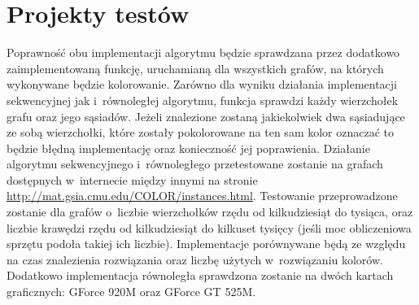 \documentclass{article}
\begin{document}
	\section{Projekty testów}
	Poprawność obu implementacji algorytmu będzie sprawdzana przez dodatkowo zaimplementowaną funkcję, uruchamianą dla wszystkich grafów, na których wykonywane będzie kolorowanie. Zarówno dla wyniku działania implementacji sekwencyjnej jak i~równoległej algorytmu, funkcja sprawdzi każdy wierzchołek grafu oraz jego sąsiadów. Jeżeli znalezione zostaną jakiekolwiek dwa sąsiadujące ze sobą wierzchołki, które zostały pokolorowane na ten sam kolor oznaczać to będzie błędną implementację oraz konieczność jej poprawienia. Działanie algorytmu sekwencyjnego i~równoległego przetestowane zostanie na grafach dostępnych w~internecie między innymi na stronie \url{http://mat.gsia.cmu.edu/COLOR/instances.html}. Testowanie przeprowadzone zostanie dla grafów o~liczbie wierzchołków rzędu od kilkudziesiąt do tysiąca, oraz liczbie krawędzi rzędu od kilkudziesiąt do kilkuset tysięcy (jeśli moc obliczeniowa sprzętu podoła takiej ich liczbie). Implementacje porównywane będą ze względu na czas znalezienia rozwiązania oraz liczbę użytych w~rozwiązaniu kolorów. Dodatkowo implementacja równoległa sprawdzona zostanie na dwóch kartach graficznych: GForce 920M oraz GForce GT 525M.
	
	

 


\end{document}
